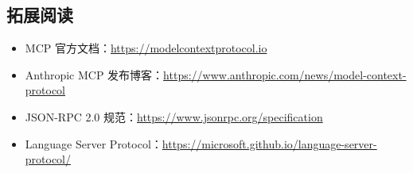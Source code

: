 \subsection{拓展阅读}

\begin{itemize}
    \item MCP 官方文档：\url{https://modelcontextprotocol.io}
    \item Anthropic MCP 发布博客：\url{https://www.anthropic.com/news/model-context-protocol}
    \item JSON-RPC 2.0 规范：\url{https://www.jsonrpc.org/specification}
    \item Language Server Protocol：\url{https://microsoft.github.io/language-server-protocol/}
\end{itemize}



